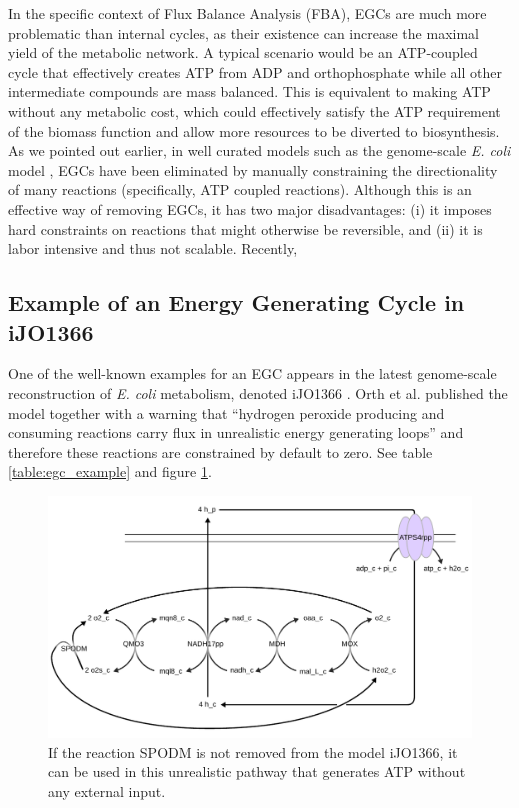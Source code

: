 \documentclass[twocolumn]{bmcart}%
\begin{document}
In the specific context of Flux Balance Analysis (FBA), EGCs are much more problematic than internal cycles, as their existence can increase the maximal yield of the metabolic network. A typical scenario would be an ATP-coupled cycle that effectively creates ATP from ADP and orthophosphate while all other intermediate compounds are mass balanced. This is equivalent to making ATP without any metabolic cost, which could effectively satisfy the ATP requirement of the biomass function and allow more resources to be diverted to biosynthesis. As we pointed out earlier, in well curated models such as the genome-scale \emph{E. coli} model \cite{Carrera2014-ys}, EGCs have been eliminated by manually constraining the directionality of many reactions (specifically, ATP coupled reactions). Although this is an effective way of removing EGCs, it has two major disadvantages: (i) it imposes hard constraints on reactions that might otherwise be reversible, and (ii) it is labor intensive and thus not scalable. Recently, 

\subsection*{Example of an Energy Generating Cycle in iJO1366}
One of the well-known examples for an EGC appears in the latest genome-scale reconstruction of \emph{E. coli} metabolism, denoted iJO1366 \cite{Orth2011-qi}. Orth et al. published the model together with a warning that ``hydrogen peroxide producing and consuming reactions carry flux in unrealistic energy generating loops'' and therefore these reactions are constrained by default to zero. 
See table \ref{table:egc_example} and figure \ref{fig:egc_example}.

\begin{figure}[h!]
	\includegraphics[width=6in]{figure2.pdf}
 	\caption{
 		If the reaction SPODM is not removed from the model iJO1366, it can
 		be used in this unrealistic pathway that generates ATP without any
 		external input.}
 	\label{fig:egc_example}
\end{figure}
\end{document}
